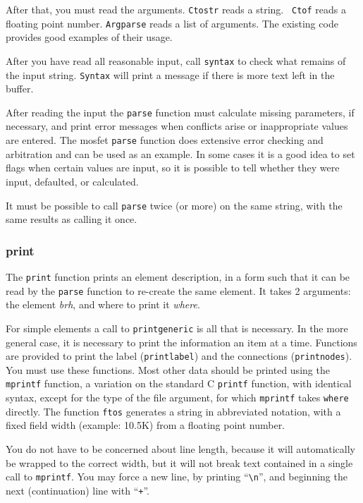 After that, you must read the arguments.  {\tt Ctostr} reads a string.  {\tt
Ctof} reads a floating point number.  {\tt Argparse} reads a list of
arguments.  The existing code provides good examples of their usage.

After you have read all reasonable input, call {\tt syntax} to check what
remains of the input string.  {\tt Syntax} will print a message if there is
more text left in the buffer.

After reading the input the {\tt parse} function must calculate missing
parameters, if necessary, and print error messages when conflicts arise or
inappropriate values are entered.  The mosfet {\tt parse} function does
extensive error checking and arbitration and can be used as an example.  In
some cases it is a good idea to set flags when certain values are input, so
it is possible to tell whether they were input, defaulted, or calculated.

It must be possible to call {\tt parse} twice (or more) on the same string,
with the same results as calling it once.
\subsubsection{print}

The {\tt print} function prints an element description, in a form such that
it can be read by the {\tt parse} function to re-create the same element.
It takes 2 arguments:  the element {\em brh}, and where to print it {\em
where}.

For simple elements a call to {\tt printgeneric} is all that is necessary.
In the more general case, it is necessary to print the information an item
at a time.  Functions are provided to print the label ({\tt printlabel}) and
the connections ({\tt printnodes}).  You must use these functions.  Most
other data should be printed using the {\tt mprintf} function, a variation
on the standard C {\tt printf} function, with identical syntax, except for
the type of the file argument, for which {\tt mprintf} takes {\tt where}
directly.  The function {\tt ftos} generates a string in abbreviated
notation, with a fixed field width (example: 10.5K) from a floating point
number.

You do not have to be concerned about line length, because it will
automatically be wrapped to the correct width, but it will not break text
contained in a single call to {\tt mprintf}.  You may force a new line, by
printing ``\verb=\n='', and beginning the next (continuation) line with
``{\tt +}''.

